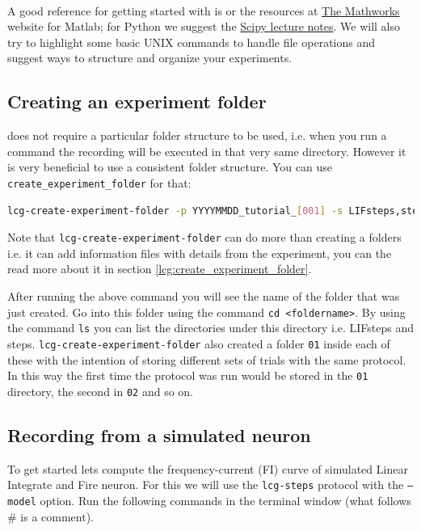 \paragraph{}A good reference for getting started with \matlab is \cite{wallisch2011} or the resources at \href{http://www.mathworks.com}{The Mathworks} website for Matlab; for Python we suggest the \href{https://scipy-lectures.github.io/}{Scipy lecture notes}. We will also try to highlight some basic UNIX commands to handle file operations  and suggest ways to structure and organize your experiments.

\subsection{Creating an experiment folder}
\progname does not require a particular folder structure to be used, i.e. when you run a command the recording will be executed in that very same directory. However it is very beneficial to use  a consistent folder structure. You can use \texttt{\progname create\_experiment\_folder} for that:

\begin{lstlisting}[numbers=none,language=bash]
lcg-create-experiment-folder -p YYYYMMDD_tutorial_[001] -s LIFsteps,steps 
\end{lstlisting}

Note that \texttt{lcg-create-experiment-folder} can do more than creating a folders i.e. it can add information files with details from the experiment, you can the read more about it in section \ref{lcg:create_experiment_folder}.

After running the above command you will see the name of the folder that was just created. Go into this folder using the \unix command \texttt{cd <foldername>}.
By using the command \texttt{ls} you can list the directories under this directory i.e. LIFsteps and steps.  \texttt{lcg-create-experiment-folder} also created a folder \texttt{01} inside each of these with the intention of storing different sets of trials with the same protocol.  In this way the first time the protocol was run would be stored in the \texttt{01} directory, the second in \texttt{02} and so on.

\subsection{Recording from a simulated neuron}

To get started lets compute the frequency-current (FI) curve of simulated Linear Integrate and Fire neuron. For this we will use the \texttt{lcg-steps} protocol with the \texttt{--model} option. 
Run the following commands in the terminal window (what follows \# is a comment).

